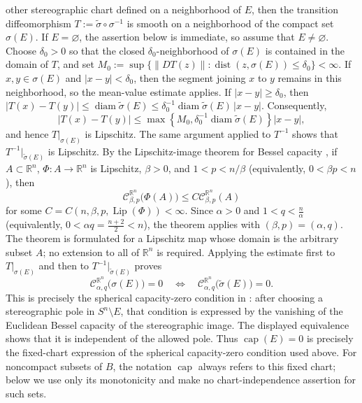 \documentclass[12pt,oneside,a4paper]{article}
\theoremstyle{mytheorem}
\theoremstyle{remark}
\theoremstyle{definition}
\begin{document}
other stereographic chart defined on a neighborhood of $E$, then the
transition diffeomorphism $T:=\widetilde\sigma\circ\sigma^{-1}$ is
smooth on a neighborhood of the compact set $\sigma(E)$.  If
$E=\varnothing$, the assertion below is immediate, so assume that
$E\neq\varnothing$.  Choose $\delta_0>0$ so that the closed
$\delta_0$-neighborhood of $\sigma(E)$ is contained in the domain of
$T$, and set
\(M_0:=\sup\bigl\{\lVert DT(z)\rVert:
\operatorname{dist}(z,\sigma(E))\leq\delta_0\bigr\}<\infty\).
If $x,y\in\sigma(E)$ and $|x-y|<\delta_0$, then the segment joining
$x$ to $y$ remains in this neighborhood, so the mean-value estimate
applies.  If $|x-y|\geq\delta_0$, then
$|T(x)-T(y)|\leq\operatorname{diam}\widetilde\sigma(E)
\leq\delta_0^{-1}\operatorname{diam}\widetilde\sigma(E)\,|x-y|$.
Consequently,
\[
 |T(x)-T(y)|
 \leq
 \max\!\left\{M_0,
 \delta_0^{-1}\operatorname{diam}\widetilde\sigma(E)\right\}|x-y|,
\]
and hence $T|_{\sigma(E)}$ is Lipschitz.  The same argument applied to
$T^{-1}$ shows that $T^{-1}|_{\widetilde\sigma(E)}$ is Lipschitz.
By the Lipschitz-image theorem for Bessel capacity
\cite[Theorem~5.2.1]{zbMATH00824833}, if
$A\subset\mathbb R^n$, $\Phi:A\to\mathbb R^n$ is Lipschitz,
$\beta>0$, and $1<p<n/\beta$ (equivalently, $0<\beta p<n$), then
\[
\mathcal{C}_{\beta,p}^{\mathbb R^n}\bigl(\Phi(A)\bigr)
\leq C\mathcal{C}_{\beta,p}^{\mathbb R^n}(A)
\]
for some $C=C(n,\beta,p,\operatorname{Lip}(\Phi))<\infty$.  Since
$\alpha>0$ and
\(1<q<\frac n\alpha\)
(equivalently, \(0<\alpha q=\tfrac{n+2}{2}<n\)),
the theorem applies with $(\beta,p)=(\alpha,q)$.
The theorem is formulated for a Lipschitz map whose domain is the
arbitrary subset $A$; no extension to all of $\mathbb R^n$ is required.
Applying the estimate first to $T|_{\sigma(E)}$ and then to
$T^{-1}|_{\widetilde\sigma(E)}$ proves
\[
\mathcal{C}_{\alpha,q}^{\mathbb R^n}\bigl(\sigma(E)\bigr)=0
\quad\Longleftrightarrow\quad
\mathcal{C}_{\alpha,q}^{\mathbb R^n}\bigl(\widetilde\sigma(E)\bigr)=0.
\]
This is precisely the spherical capacity-zero condition in
\cite[Section~2.2 and the proof of Theorem~1.1]{zbMATH07873599}: after
choosing a stereographic pole in $S^n\setminus E$, that condition is
expressed by the vanishing of the Euclidean Bessel capacity of the
stereographic image.  The displayed equivalence shows that it is
independent of the allowed pole.  Thus $\operatorname{cap}(E)=0$ is
precisely the fixed-chart expression of the spherical capacity-zero
condition used above.
For noncompact subsets of \(B\), the notation \(\operatorname{cap}\)
always refers to this fixed chart; below we use only its monotonicity and
make no chart-independence assertion for such sets.
\end{document}
